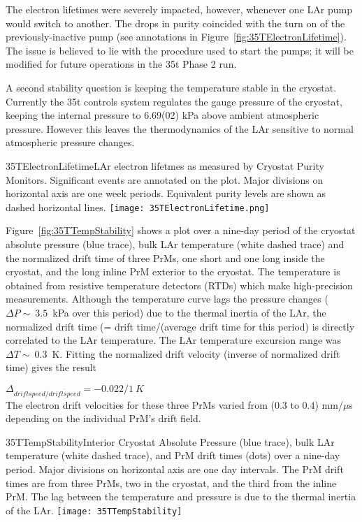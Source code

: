 The electron lifetimes were severely impacted, however, whenever one LAr pump would switch to 
another. The drops in purity coincided with the turn on of the previously-inactive pump (see annotations 
in Figure~\ref{fig:35TElectronLifetime}). The issue is believed to lie with the procedure used to start the 
pumps; it will be modified for future operations in the 35t Phase 2 run.

A second stability question is keeping the temperature stable in the cryostat. Currently the 35t controls 
system regulates the gauge pressure of the cryostat, keeping the internal pressure to 6.69(02) kPa above 
ambient atmospheric pressure. However this leaves the thermodynamics of the LAr sensitive to normal 
atmospheric pressure changes.

\begin{cdrfigure}{35TElectronLifetime}{LAr electron lifetmes as measured by 
Cryostat Purity Monitors. Significant events are annotated on the plot. Major divisions on horizontal axis 
are one week periods. Equivalent purity levels are shown as dashed horizontal lines.}
  \texttt{[image: 35TElectronLifetime.png]}
\end{cdrfigure}

Figure~\ref{fig:35TTempStability} shows a plot over a nine-day period of the cryostat absolute pressure (blue 
trace), bulk LAr temperature (white dashed trace) and the normalized drift time of three PrMs, one short 
and one long inside the cryostat, and the long inline PrM exterior to the cryostat. The temperature is obtained  
from resistive temperature detectors (RTDs) which make high-precision measurements.
Although the temperature curve lags the pressure changes ($\Delta P \sim~3.5$~kPa over this period) due to the thermal 
inertia of the LAr, the normalized drift time (= drift time/(average drift time for this period) is 
directly correlated to the LAr temperature. The LAr temperature excursion range was $\Delta T \sim~0.3$~K. 
Fitting the normalized drift velocity (inverse of normalized drift time) gives the result 

 $\Delta_{driftspeed/\overline{driftspeed}} = -0.022/1~K$\\
 
The electron drift velocities for these three PrMs varied from (0.3 to 0.4) mm/$\mu$s depending on the individual PrM's drift field. 

\begin{cdrfigure}{35TTempStability}{Interior Cryostat Absolute Pressure 
(blue trace), bulk LAr temperature (white dashed trace), and PrM drift times (dots) over a nine-day period. 
Major divisions on horizontal axis are one day intervals. The PrM drift times are from three PrMs, two in 
the cryostat, and the third from the inline PrM. The lag between the temperature and pressure is due to 
the thermal inertia of the LAr.}
  \texttt{[image: 35TTempStability]}
\end{cdrfigure}

